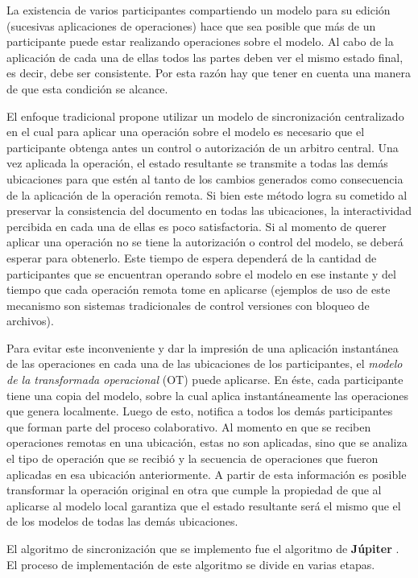 \documentclass[12pt,a4paper]{article}
\begin{document}
	La existencia de varios participantes compartiendo un modelo para su edición (sucesivas aplicaciones de
	operaciones) hace que sea posible que más de un participante puede estar realizando operaciones sobre el modelo.
	Al cabo de la aplicación de cada una de ellas todos las partes deben ver el mismo estado final, es decir,
	debe ser consistente. Por esta razón hay que tener en cuenta una manera de que esta condición se alcance.

	El enfoque tradicional propone utilizar un modelo de sincronización centralizado en el cual para aplicar una
	operación sobre el modelo es necesario que el participante obtenga antes un control o autorización de un
	arbitro central. Una vez aplicada la operación, el estado resultante se transmite a todas las demás ubicaciones
	para que estén al tanto de los cambios generados como consecuencia de la aplicación de la operación remota.
	Si bien este método logra su cometido al preservar la consistencia del documento en todas las ubicaciones, la
	interactividad percibida en cada una de ellas es poco satisfactoria. Si al momento de querer aplicar una 
	operación no se tiene la autorización o control del modelo, se deberá esperar para obtenerlo. 
	Este tiempo de espera dependerá de la cantidad de participantes que se encuentran operando sobre el modelo
	en ese instante y del tiempo que cada operación remota tome en aplicarse (ejemplos de uso de este mecanismo
	son sistemas tradicionales de control versiones con bloqueo de archivos).

	Para evitar este inconveniente y dar la impresión de una aplicación instantánea de las operaciones en cada
	una de las ubicaciones de los participantes, el \textit{modelo de la transformada operacional} (OT) \cite{operationaltransform} puede
	aplicarse. En éste, cada participante tiene una copia del modelo, sobre la cual aplica instantáneamente
	las operaciones que genera localmente. Luego de esto, notifica a todos los demás participantes que forman
	parte del proceso colaborativo.
	Al momento en que se reciben operaciones remotas en una ubicación, estas no son aplicadas, sino que se analiza
	el tipo de operación que se recibió y la secuencia de operaciones que fueron aplicadas en esa ubicación
	anteriormente. A partir de esta información es posible transformar la operación original en otra que cumple
	la propiedad de que al aplicarse al modelo local garantiza que el estado resultante será el mismo que el de
	los modelos de todas las demás ubicaciones.

	El algoritmo de sincronización que se implemento fue el algoritmo de \textbf{Júpiter} \cite{jupiter}. 
	El proceso de implementación de este algoritmo se divide en varias etapas.
	
\end{document}
